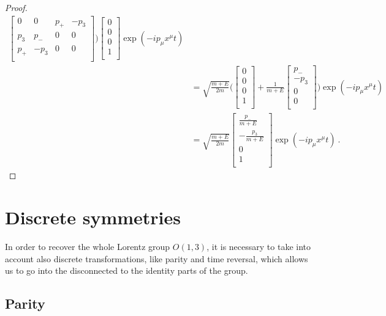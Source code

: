 \begin{proof}
\begin{equation*}
\begin{aligned}
\begin{bmatrix}
                0 & 0 & p_+ & - p_3 \\
                p_3 & p_- & 0 & 0 \\
                p_+ & -p_3 & 0 & 0 \\
            \end{bmatrix} \Big) \begin{bmatrix}
                0 \\ 0 \\ 0 \\ 1 \\
            \end{bmatrix} \exp(- i p_\mu x^\mu t) \\ & = \sqrt{\frac{m + E}{2m}} \Big ( \begin{bmatrix}
                0 \\ 0 \\ 0 \\ 1 \\
            \end{bmatrix} + \frac{1}{m + E} \begin{bmatrix}
                p_- \\ - p_3 \\ 0 \\ 0 \\
            \end{bmatrix} \Big) \exp(- i p_\mu x^\mu t) \\ & = \sqrt{\frac{m + E}{2m}} \begin{bmatrix}
                \frac{p_- }{m+E}\\ - \frac{p_3}{m+E} \\ 0 \\ 1 \\
            \end{bmatrix} \exp(-ip_\mu x^\mu t) ~.
        \end{aligned}
        \end{equation*}
    \end{proof}

\chapter{Discrete symmetries} 

    In order to recover the whole Lorentz group $O(1,3)$, it is necessary to take into account also discrete transformations, like parity and time reversal, which allows us to go into the disconnected to the identity parts of the group. 

\section{Parity} 

